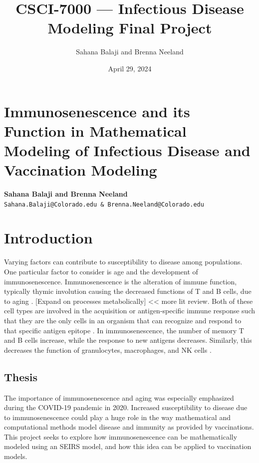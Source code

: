 \documentclass{article}
\title{CSCI-7000 — Infectious Disease Modeling Final Project}
\author{Sahana Balaji and Brenna Neeland}
\date{April 29, 2024}
\begin{document}
\maketitle

\section{Immunosenescence and its Function in Mathematical Modeling of Infectious Disease and Vaccination Modeling}
\textbf{Sahana Balaji and Brenna Neeland}\\
\texttt{Sahana.Balaji@Colorado.edu \& Brenna.Neeland@Colorado.edu}

\section{Introduction}
Varying factors can contribute to susceptibility to disease among populations. One particular factor to consider is age and the development of immunosenescence. Immunosenescence is the alteration of immune function, typically thymic involution causing the decreased functions of T and B cells, due to aging \cite{rink2022}. [Expand on processes metabolically] << more lit review. Both of these cell types are involved in the acquisition or antigen-specific immune response such that they are the only cells in an organism that can recognize and respond to that specific antigen epitope \cite{cano2013}. In immunosenescence, the number of memory T and B cells increase, while the response to new antigens decreases. Similarly, this decreases the function of granulocytes, macrophages, and NK cells \cite{rink2022}. 

\subsection{Thesis}
The importance of immunosenescence and aging was especially emphasized during the COVID-19 pandemic in 2020. Increased susceptibility to disease due to immunosenescence could play a huge role in the way mathematical and computational methods model disease and immunity as provided by vaccinations. This project seeks to explore how immunosenescence can be mathematically modeled using an SEIRS model, and how this idea can be applied to vaccination models. 
\end{document}
